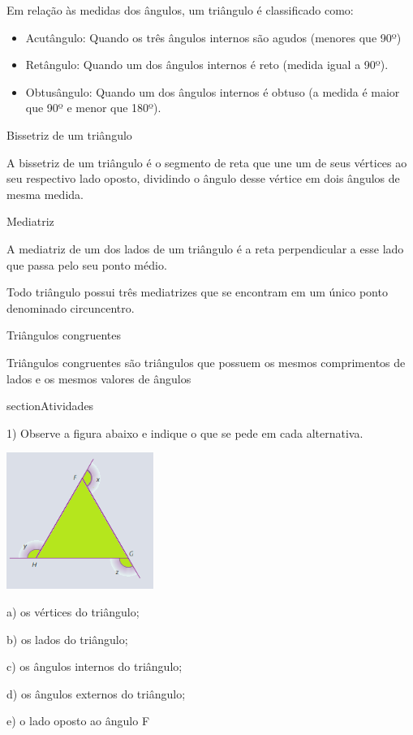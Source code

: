 Em relação às medidas dos ângulos, um triângulo é classificado como:

\begin{itemize}
\item
  Acutângulo: Quando os três ângulos internos são agudos (menores que
  90º)
\item
  Retângulo: Quando um dos ângulos internos é reto (medida igual a 90º).
\item
  Obtusângulo: Quando um dos ângulos internos é obtuso (a medida é maior
  que 90º e menor que 180º).
\end{itemize}

Bissetriz de um triângulo

A bissetriz de um triângulo é o segmento de reta que une um de seus
vértices ao seu respectivo lado oposto, dividindo o ângulo desse vértice
em dois ângulos de mesma medida.

Mediatriz

A mediatriz de um dos lados de um triângulo é a reta perpendicular a
esse lado que passa pelo seu ponto médio.

Todo triângulo possui três mediatrizes que se encontram em um único
ponto denominado circuncentro.

Triângulos congruentes

Triângulos congruentes são triângulos que possuem os mesmos comprimentos
de lados e os mesmos valores de ângulos

section{Atividades}

1) Observe a figura abaixo e indique o que se pede em cada alternativa.

\includegraphics[width=1.88333in,height=1.75048in]{./imgSAEB_8_MAT/media/image13.png}

a) os vértices do triângulo;

b) os lados do triângulo;

c) os ângulos internos do triângulo;

d) os ângulos externos do triângulo;

e) o lado oposto ao ângulo F

